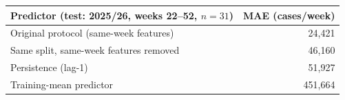 \begin{tabular}{lr}
\toprule
Predictor (test: 2025/26, weeks 22--52, $n=31$) & MAE (cases/week) \\
\midrule
Original protocol (same-week features) & 24,421 \\
Same split, same-week features removed & 46,160 \\
Persistence (lag-1) & 51,927 \\
Training-mean predictor & 451,664 \\
\bottomrule
\end{tabular}
